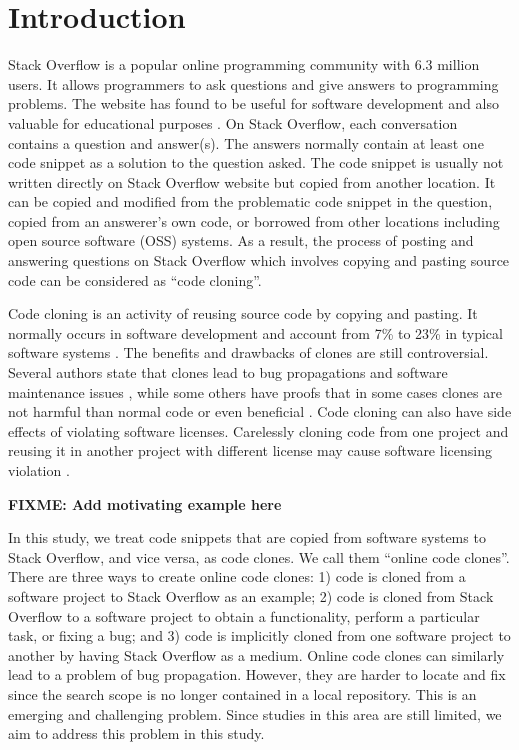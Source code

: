 \documentclass{sig-alternate-05-2015}
\newcommand\FIXME[1]{\textbf{FIXME: #1}}
\begin{document}
\section{Introduction}
Stack Overflow is a popular online programming community with 6.3 million users. It allows programmers to ask questions and give answers to programming problems. The website has found to be useful for software development and also valuable for educational purposes \cite{x}. On Stack Overflow, each conversation contains a question and answer(s).  The answers normally contain at least one code snippet as a solution to the question asked. The code snippet is usually not written directly on Stack Overflow website but copied from another location. It can be copied and modified from the problematic code snippet in the question, copied from an answerer's own code, or borrowed from other locations including open source software (OSS) systems. As a result, the process of posting and answering questions on Stack Overflow which involves copying and pasting source code can be considered as ``code cloning''. 

Code cloning is an activity of reusing source code by copying and pasting. It normally occurs in software development and account from 7\% to 23\% in typical software systems \cite{Bellon2007}. The benefits and drawbacks of clones are still controversial. Several authors state that clones lead to bug propagations and software maintenance issues \cite{Kamiya2002}, while some others have proofs that in some cases clones are not harmful than normal code or even beneficial \cite{Saini2016,Kapser2006}. Code cloning can also have side effects of violating software licenses. Carelessly cloning code from one project and reusing it in another project with different license may cause software licensing violation \cite{German2009}.

\FIXME{Add motivating example here}

In this study, we treat code snippets that are copied from software systems to Stack Overflow, and vice versa, as code clones. We call them ``online code clones''. There are three ways to create online code clones: 1) code is cloned from a software project to Stack Overflow as an example; 2) code is cloned from Stack Overflow to a software project to obtain a functionality, perform a particular task, or fixing a bug; and 3) code is implicitly cloned from one software project to another by having Stack Overflow as a medium. Online code clones can similarly lead to a problem of bug propagation. However, they are harder to locate and fix since the search scope is no longer contained in a local repository. %
This is an emerging and challenging problem. Since studies in this area are still limited, we aim to address this problem in this study. %
\end{document}
